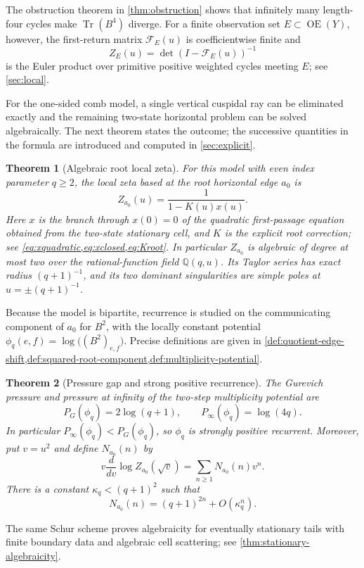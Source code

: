 \documentclass[11pt,reqno]{amsart}
\numberwithin{equation}{section}
\newtheorem{theorem}{Theorem}[section]
\theoremstyle{definition}
\theoremstyle{remark}
\newcommand{\OrE}{\operatorname{OE}}
\newcommand{\Tr}{\operatorname{Tr}}
\newcommand{\cF}{\mathcal F}
\begin{document}
The obstruction theorem in \cref{thm:obstruction} shows that infinitely many
length-four cycles make $\Tr(B^4)$ diverge.  For a finite observation set
$E\subset\OrE(Y)$, however, the first-return matrix $\cF_E(u)$ is
coefficientwise finite and
\[
 Z_E(u)=\det(I-\cF_E(u))^{-1}
\]
is the Euler product over primitive positive weighted cycles meeting $E$; see
\cref{sec:local}.

For the one-sided comb model, a single vertical cuspidal ray can be
eliminated exactly and the remaining two-state horizontal problem can be
solved algebraically.  The next theorem states the outcome; the successive
quantities in the formula are introduced and computed in
\cref{sec:explicit}.

\begin{theorem}[Algebraic root local zeta]
\label{thm:intro-algebraic}
For this model with even index parameter $q\ge2$, the local zeta based at
the root horizontal edge $a_0$ is
\[
 Z_{a_0}(u)=\frac1{1-K(u)x(u)}.
\]
Here $x$ is the branch through $x(0)=0$ of the quadratic first-passage
equation obtained from the two-state stationary cell, and $K$ is the explicit
root correction; see \cref{eq:xquadratic,eq:xclosed,eq:Kroot}.  In particular
$Z_{a_0}$ is algebraic of degree at most two over the rational-function field
$\mathbb Q(q,u)$.  Its Taylor series has exact radius $(q+1)^{-1}$, and its
two dominant singularities are simple poles at $u=\pm(q+1)^{-1}$.
\end{theorem}

Because the model is bipartite, recurrence is studied on the communicating
component of $a_0$ for $B^2$, with the locally constant potential
$\phi_q(e,f)=\log\!\bigl((B^2)_{e,f}\bigr)$.  Precise definitions are given in
\cref{def:quotient-edge-shift,def:squared-root-component,def:multiplicity-potential}.

\begin{theorem}[Pressure gap and strong positive recurrence]
\label{thm:intro-pressure-gap}
The Gurevich pressure and pressure at infinity of the two-step multiplicity
potential are
\[
 P_G(\phi_q)=2\log(q+1),
 \qquad
 P_\infty(\phi_q)=\log(4q).
\]
In particular $P_\infty(\phi_q)<P_G(\phi_q)$, so $\phi_q$ is strongly
positive recurrent.  Moreover, put $v=u^2$ and define $N_{a_0}(n)$ by
\[
 v\frac{d}{dv}\log Z_{a_0}(\sqrt v)
 =\sum_{n\ge1}N_{a_0}(n)v^n.
\]
There is a constant $\kappa_q<(q+1)^2$ such that
\[
 N_{a_0}(n)=(q+1)^{2n}+O(\kappa_q^n).
\]
\end{theorem}
The same Schur scheme proves algebraicity for eventually stationary tails
with finite boundary data and algebraic cell scattering; see
\cref{thm:stationary-algebraicity}.
\end{document}
